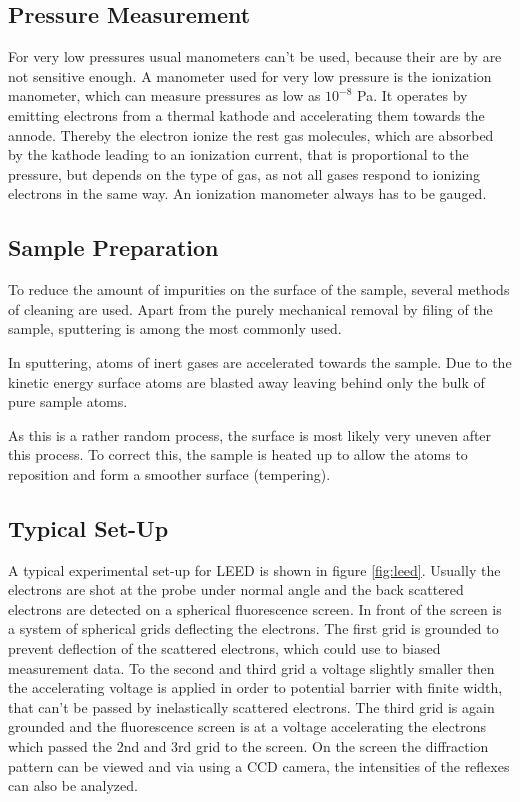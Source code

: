 \documentclass[a4paper]{scrartcl}
\numberwithin{equation}{section}
\numberwithin{figure}{section}
\numberwithin{table}{section}
\begin{document}
\subsection{Pressure Measurement}
For very low pressures usual manometers can't be used, because their are by are not sensitive enough. A manometer used for very low pressure is the ionization manometer, which can measure pressures as low as $10^{-8}$ Pa. It operates by emitting electrons from a thermal kathode and accelerating them towards the annode. Thereby the electron ionize the rest gas molecules, which are absorbed by the kathode leading to an ionization current, that is proportional to the pressure, but depends on the type of gas, as not all gases respond to ionizing electrons in the same way. An ionization manometer always has to be gauged.

\subsection{Sample Preparation}
To reduce the amount of impurities on the surface of the sample, several methods of cleaning are used. Apart from the purely mechanical removal by filing of the sample, sputtering is among the most commonly used. 

In sputtering, atoms of inert gases are accelerated towards the sample. Due to the kinetic energy surface atoms are blasted away leaving behind only the bulk of pure sample atoms.

As this is a rather random process, the surface is most likely very uneven after this process. To correct this, the sample is heated up to allow the atoms to reposition and form a smoother surface (tempering).

\subsection{Typical Set-Up}
A typical experimental set-up for LEED is shown in figure \ref{fig:leed}. Usually the electrons are shot at the probe under normal angle and the back scattered electrons are detected on a spherical fluorescence screen. In front of the screen is a system of spherical grids deflecting the electrons. The first grid is grounded to prevent deflection of the scattered electrons, which could use to biased measurement data. To the second and third grid a voltage slightly smaller then the accelerating voltage is applied in order to potential barrier with finite width, that can't be passed by inelastically scattered electrons. The third grid is again grounded and the fluorescence screen is at a voltage accelerating the electrons which passed the 2nd and 3rd grid to the screen. On the screen the diffraction pattern can be viewed and via using a CCD camera, the intensities of the reflexes can also be analyzed.
\end{document}
